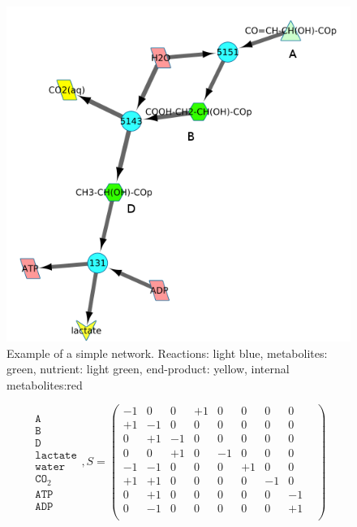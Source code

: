 \documentclass[10pt,a4paper]{article}
\begin{document}
\begin{figure}[htbp]
	\centering
	\includegraphics[width=0.5\linewidth]{initial_network_ABC.png}
	\caption{Example of a simple network. Reactions: light blue, metabolites: green, nutrient: light green, end-product: yellow, internal metabolites:red}
	\label{fig:examplenetwork}
\end{figure}

	\begin{equation}
	\begin{matrix}
		\texttt{A}   \\
		\texttt{B}\\
		\texttt{D}\\
		\texttt{lactate}\\
		\texttt{water}\\
		\texttt{CO}_2\\
		\texttt{ATP}\\
		\texttt{ADP}
	\end{matrix}
	,S=
	\begin{pmatrix}
			  -1 &  0 &  0 & +1 &  0 &  0 & 0 & 0 & \\ 
			  +1 & -1 &  0 &  0 &  0 &  0 & 0 &0 &  \\ 
			  0 & +1 & -1 &  0 &  0 &  0 & 0 & 0 & \\ 
			  0  &  0 & +1 &  0 & -1 &  0 & 0 & 0 & \\ 
			  -1 & -1 &  0 &  0 &  0 &+1  & 0 & 0 & \\ 
			  +1 & +1 &  0 &  0 &  0 &  0 & -1&0 &  \\ 
			  0 & +1 &  0 &  0 &  0 & 0 &0 & -1 &\\ 
			  0 & -1 &  0 &  0 &  0 & 0 &0 & +1 & \\ 
			  
		\end{pmatrix} 
		\label{eq:examplematrix}
	\end{equation}
\end{document}
